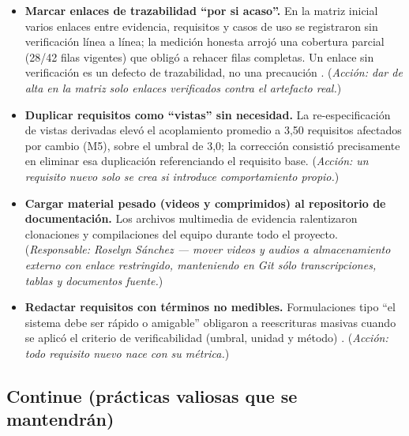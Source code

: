\begin{itemize}[leftmargin=0.8cm]
  \item \textbf{Marcar enlaces de trazabilidad ``por si acaso''.} En la matriz inicial varios enlaces entre evidencia, requisitos y casos de uso se registraron sin verificaci\'on l\'inea a l\'inea; la medici\'on honesta arroj\'o una cobertura parcial (28/42 filas vigentes) que oblig\'o a rehacer filas completas. Un enlace sin verificaci\'on es un defecto de trazabilidad, no una precauci\'on \cite{gotel1994}. (\emph{Acci\'on: dar de alta en la matriz solo enlaces verificados contra el artefacto real.})
  \item \textbf{Duplicar requisitos como ``vistas'' sin necesidad.} La re-especificaci\'on de vistas derivadas elev\'o el acoplamiento promedio a 3,50 requisitos afectados por cambio (M5), sobre el umbral de 3,0; la correcci\'on consisti\'o precisamente en eliminar esa duplicaci\'on referenciando el requisito base. (\emph{Acci\'on: un requisito nuevo solo se crea si introduce comportamiento propio.})
  \item \textbf{Cargar material pesado (videos y comprimidos) al repositorio de documentaci\'on.} Los archivos multimedia de evidencia ralentizaron clonaciones y compilaciones del equipo durante todo el proyecto. (\emph{Responsable: Roselyn S\'anchez --- mover videos y audios a almacenamiento externo con enlace restringido, manteniendo en Git s\'olo transcripciones, tablas y documentos fuente.})
  \item \textbf{Redactar requisitos con t\'erminos no medibles.} Formulaciones tipo ``el sistema debe ser r\'apido o amigable'' obligaron a reescrituras masivas cuando se aplic\'o el criterio de verificabilidad (umbral, unidad y m\'etodo) \cite{iso29148}. (\emph{Acci\'on: todo requisito nuevo nace con su m\'etrica.})
\end{itemize}

\subsection{Continue (pr\'acticas valiosas que se mantendr\'an)}

